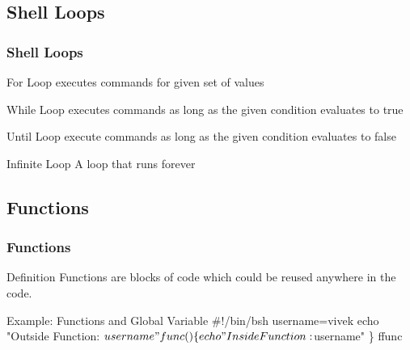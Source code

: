 \documentclass{beamer}
\begin{document}
\subsection{ Shell Loops }
\begin{frame}\frametitle{ Shell Loops }

\begin{block}{ For Loop }
executes commands for given set of values
\end{block}
\pause
\begin{block}{ While Loop }
executes commands as long as the given condition evaluates to true
\end{block}
\pause
\begin{block}{ Until Loop }
execute commands as long as the given condition evaluates to false
\end{block}
\pause
\begin{block}{ Infinite Loop }
A loop that runs forever
\end{block}

\end{frame}
\subsection{ Functions }
\begin{frame}\frametitle{ Functions }

\begin{block}{ Definition }
Functions are blocks of code which could be reused anywhere in the code.
\end{block}
\pause
\begin{exampleblock}{ Example: Functions and Global Variable }
\#!/bin/bsh \newline
username=vivek \newline
echo "Outside Function: $username" \newline
func() \newline
\{ \newline
echo "Inside Function: $username" \newline
\} \newline
ffunc
\end{exampleblock}

\end{frame}
\end{document}
